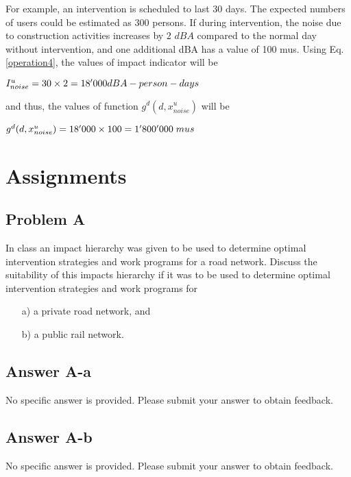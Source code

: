For example, an intervention is scheduled to last 30 days. The expected numbers of users could be estimated as 300 persons. If during intervention, the noise due to construction activities increases by 2 $dBA$ compared to the normal day without intervention, and one additional dBA has a value of 100 mus. Using Eq. \eqref{operation4}, the values of impact indicator will be

$I^u_{noise}=30 \times 2 \time 300 = 18'000 dBA-person-days$

and thus, the values of function $g^d(d,x^u_{noise})$ will be 

$g^d(d,x^u_{noise}) = 18'000 \times 100 = 1'800'000 \hspace {1mm} mus$
%
\section{Assignments}
\subsection{Problem A}
In class an impact hierarchy was given to be used to determine optimal intervention strategies and work programs for a road network. Discuss the suitability of this impacts hierarchy if it was to be used to determine optimal intervention strategies and work programs for 
\begin{adjustwidth}{1cm}{}
\begin{itemize}
\item[a)] a private road network, and 
\item[b)] a public rail network.                         
\end{itemize}
\end{adjustwidth}
%
\subsection{Answer A-a}
No specific answer is provided. Please submit your answer to obtain feedback. 
\subsection{Answer A-b}
No specific answer is provided. Please submit your answer to obtain feedback. 
%
